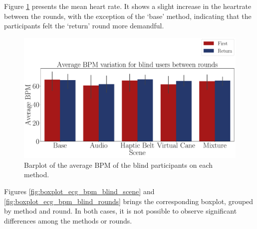 

Figure \ref{fig:barplot_ecg_bpm_5_scene_blind} presents the mean heart rate. It shows a slight increase in the heartrate between the rounds, with the exception of the ‘base’ method, indicating that the participants felt the ‘return’ round more demandful.

\begin{figure}[!htb]
    \centering
    \includegraphics[width = \textwidth]{Resultados/ECG/Figuras/pdf/barplot_ecg_bpm_5_scene_blind.pdf}
    \caption{Barplot of the average BPM of the blind participants on each method.}
    \label{fig:barplot_ecg_bpm_5_scene_blind}
\end{figure}

% 
%

Figures \ref{fig:boxplot_ecg_bpm_blind_scene} and \ref{fig:boxplot_ecg_bpm_blind_rounds} brings the corresponding boxplot, grouped by method and round. In both cases, it is not possible to observe significant differences among the methods or rounds.

